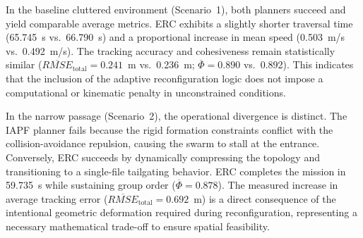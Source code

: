 \documentclass[pdflatex,sn-basic]{sn-jnl}%
\begin{document}
        \begin{table}
            \centering
            \caption{Comparison of IAPF and ERC across Scenarios 1--2.}
            \label{tab:compare_iapf_erc}
            \small

        \end{table}

        In the baseline cluttered environment (Scenario~1), both planners succeed and yield comparable average metrics. ERC exhibits a slightly shorter traversal time (65.745~s vs.~66.790~s) and a proportional increase in mean speed (0.503~m/s vs.~0.492~m/s). The tracking accuracy and cohesiveness remain statistically similar ($\overline{RMSE}_{\text{total}}=0.241$~m vs.~0.236~m; $\overline{\Phi}=0.890$ vs.~0.892). This indicates that the inclusion of the adaptive reconfiguration logic does not impose a computational or kinematic penalty in unconstrained conditions.

        In the narrow passage (Scenario~2), the operational divergence is distinct. The IAPF planner fails because the rigid formation constraints conflict with the collision-avoidance repulsion, causing the swarm to stall at the entrance. Conversely, ERC succeeds by dynamically compressing the topology and transitioning to a single-file tailgating behavior. ERC completes the mission in 59.735~s while sustaining group order ($\overline{\Phi}=0.878$). The measured increase in average tracking error ($\overline{RMSE}_{\text{total}}=0.692$~m) is a direct consequence of the intentional geometric deformation required during reconfiguration, representing a necessary mathematical trade-off to ensure spatial feasibility.
\end{document}
